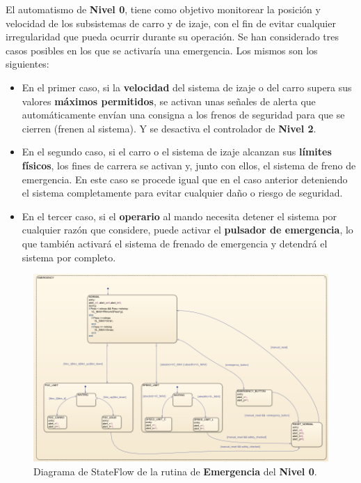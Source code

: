 \documentclass[11pt]{article}
\begin{document}
El automatismo de \textbf{Nivel 0}, tiene como objetivo monitorear la posición y velocidad de los subsistemas de carro y de izaje, con el fin de evitar cualquier irregularidad que pueda ocurrir durante su operación. Se han considerado tres casos posibles en los que se activaría una emergencia. Los mismos son los siguientes:

\begin{itemize}
	\item En el primer caso, si la \textbf{velocidad} del sistema de izaje o del carro supera sus valores \textbf{máximos permitidos}, se activan unas señales de alerta que automáticamente envían una consigna a los frenos de seguridad para que se cierren (frenen al sistema). Y se desactiva el controlador de \textbf{Nivel 2}.

	\item En el segundo caso, si el carro o el sistema de izaje alcanzan sus \textbf{límites físicos}, los fines de carrera se activan y, junto con ellos, el sistema de freno de emergencia. En este caso se procede igual que en el caso anterior deteniendo el sistema completamente para evitar cualquier daño o riesgo de seguridad.
	
	\item En el tercer caso, si el \textbf{operario} al mando necesita detener el sistema por cualquier razón que considere, puede activar el \textbf{pulsador de emergencia}, lo que también activará el sistema de frenado de emergencia y detendrá el sistema por completo.
\end{itemize}

\begin{figure}[!h]
	\centering
	\includegraphics[width=1\textwidth]{images/imagen_27_emergencia.png}
	\caption{Diagrama de StateFlow de la rutina de \textbf{Emergencia} del \textbf{Nivel 0}.}
	\label{fig:nivel_0_emergencia}
\end{figure}
\end{document}
